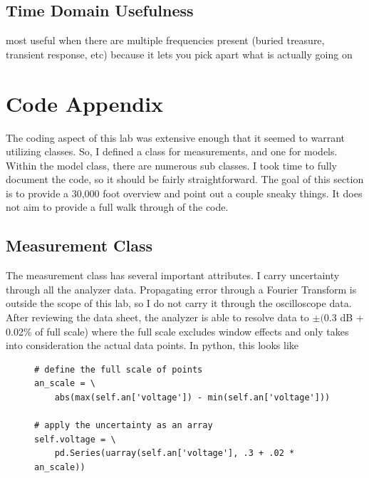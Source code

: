 \documentclass{article}
\begin{document}
\subsection{Time Domain Usefulness}%
\label{sub:time_domain_usefulness}

most useful when there are multiple frequencies present (buried treasure,
transient response, etc) because it lets you pick apart what is actually going
on

\section{Code Appendix}%
\label{sec:code_appendix}

The coding aspect of this lab was extensive enough that it seemed
to warrant utilizing classes. So, I defined a class for measurements, and one
for models. Within the model class, there are numerous sub classes. I took time
to fully document the code, so it should be fairly straightforward. The goal of
this section is to provide a 30,000 foot overview and point out a couple sneaky
things. It does not aim to provide a full walk through of the code.


\subsection{Measurement Class}%
\label{sub:measurement_class}

The measurement class has several important attributes. I carry uncertainty
through all the analyzer data. Propagating error through a Fourier Transform is
outside the scope of this lab, so I do not carry it through the oscilloscope
data. After reviewing the data sheet, the analyzer is able to resolve data to
$\pm($0.3 dB + 0.02\% of full scale) where the full scale excludes window
effects and only takes into consideration the actual data points. In python,
this looks like

\begin{figure}[H]
\centering
\begin{minipage}{1\textwidth}
\begin{tcolorbox}
\begin{verbatim}
# define the full scale of points
an_scale = \
    abs(max(self.an['voltage']) - min(self.an['voltage']))

# apply the uncertainty as an array
self.voltage = \
    pd.Series(uarray(self.an['voltage'], .3 + .02 * an_scale))
\end{verbatim}
\end{tcolorbox}
\end{minipage}
\end{figure}
\end{document}
